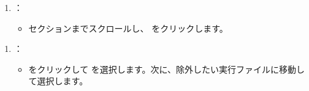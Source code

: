 \documentclass[letterpaper,10pt,dvipdfmx]{sphinxmanual}
\begin{document}
\begin{figure}[htbp]
\centering

\noindent{}
\end{figure}
\begin{enumerate}
%
\setcounter{enumi}{3}
\item {} 
\sphinxAtStartPar
{}：
\begin{itemize}
\item {} 
\sphinxAtStartPar
{} セクションまでスクロールし、 をクリックします。

\end{itemize}

\end{enumerate}

\begin{figure}[htbp]
\centering

\noindent{}
\end{figure}
\begin{enumerate}
%
\setcounter{enumi}{4}
\item {} 
\sphinxAtStartPar
{}：
\begin{itemize}
\item {} 
\sphinxAtStartPar
{} をクリックして  を選択します。次に、除外したい実行ファイルに移動して選択します。

\end{itemize}

\end{enumerate}

\begin{figure}[htbp]
\centering

\noindent{}
\end{figure}

\begin{figure}[htbp]
\centering

\noindent{}
\end{figure}

\begin{figure}[htbp]
\centering

\noindent{}
\end{figure}
\end{document}
